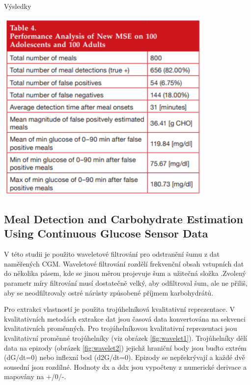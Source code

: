 \begin{table}[H]
\caption{Výsledky}
\label{tab:threshold3}
\centering
\includegraphics[width=0.8\textwidth]{img/analyza/threshold3.png}
\end{table}


\subsection{Meal Detection and Carbohydrate Estimation Using Continuous Glucose Sensor Data \citep{Analyza.WaveletEst}}
\label{ch:wavelet}

V této studii je použito waveletové filtrování pro odstranění šumu z dat naměřených CGM. Waveletové filtrování rozdělí frekvenční obsah vstupních dat do několika pásem, kde se jinou měrou projevuje šum a užitečná složka \citep{Analyza.Wavelet}.Zvolený parametr míry filtrování musí dostatečně velký, aby odfiltroval šum, ale ne přiliš, aby se neodfiltrovaly ostré nárůsty způsobené příjmem karbohydrátů.

Pro extrakci vlastností je použita trojúhelníková kvalitativní reprezentace. V kvalitativních metodách extrakce dat jsou časová data konvertována na sekvenci kvalitativních proměnných. Pro trojúhelníkovou kvalitativní reprezentaci jsou kvalitativní proměnné trojúhelníky (viz obrázek \ref{fig:wavelet1}). Trojúhelníky dělí data na epizody (obrázek \ref{fig:wavelet2}) jejichž hraniční body jsou buďto extrém (dG/dt=0) nebo inflexní bod (d2G/dt=0). Epizody se nepřekrývají a každé dvě sousední jsou rozdílné. Hodnoty dx a ddx jsou vypočteny z numerické derivace a mapovány na +/0/-.

